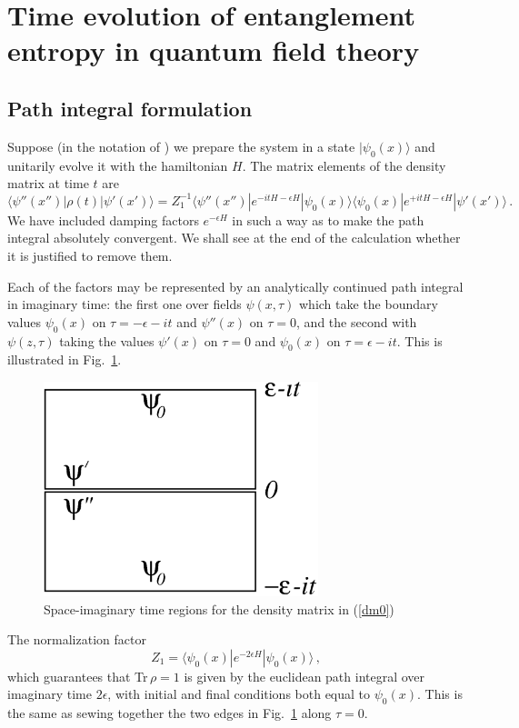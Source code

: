 \documentclass[12pt,preprint,tighten,eqsecnum,aps,floats,psfig,epsfig,amsmath,onecolumn]{revtex4-1}
\def\e{\epsilon}
\begin{document}
\section{Time evolution of entanglement entropy in quantum field theory}
\label{cftsec}

\subsection{Path integral formulation}

Suppose (in the notation of \cite{cc-04}) we prepare the system in
a state $|\psi_0(x)\rangle$ and unitarily evolve it with the
hamiltonian $H$. The matrix elements of the density matrix at time
$t$ are
\begin{equation}
\langle\psi''(x'')|\rho(t)|\psi'(x')\rangle=Z_1^{-1}
\langle\psi''(x'')|e^{-itH-\e H}|\psi_0(x)\rangle
\langle\psi_0(x)|e^{+itH-\e H}|\psi'(x')\rangle\,. \label{dm0}
\end{equation}
We have included damping factors $e^{-\e H}$
in such a way as to make the path
integral absolutely convergent. We shall see at the end of the
calculation whether it is justified to remove them.

Each of the factors may be represented by an analytically
continued path integral in imaginary time: the first one over
fields $\psi(x,\tau)$ which take the boundary values $\psi_0(x)$
on $\tau=-\e-it$  and $\psi''(x)$ on $\tau=0$, and the second with
$\psi(z,\tau)$ taking the values $\psi'(x)$ on $\tau=0$ and
$\psi_0(x)$ on $\tau=\e-it$. This is illustrated in
Fig.~\ref{figpi}.
\begin{figure}[ht]
\centering
\includegraphics[width=8cm]{pi.eps}
\caption{Space-imaginary time regions for the density matrix in (\ref{dm0})}
\label{figpi}
\end{figure}


The normalization factor
\begin{equation}
Z_1=\langle\psi_0(x)|e^{-2\e H}|\psi_0(x)\rangle\,,
\end{equation}
which guarantees that Tr\,$\rho=1$ is given by the euclidean path
integral over imaginary time $2\e$, with initial and final
conditions both equal to $\psi_0(x)$. This is the same as sewing
together the two edges in Fig.~\ref{figpi} along $\tau=0$.
\end{document}
